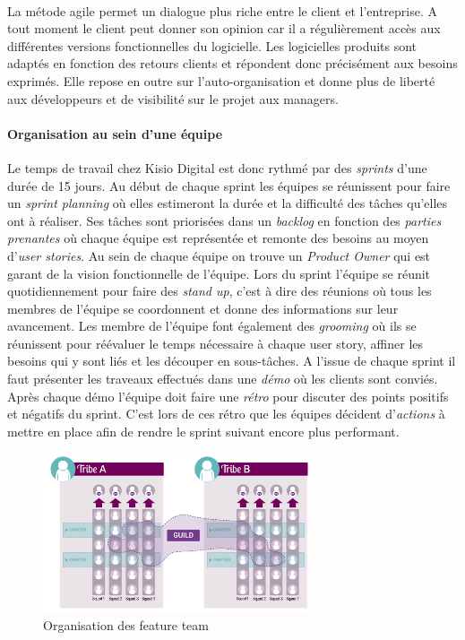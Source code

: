 \documentclass[a4paper]{report}
\begin{document}
\paragraph{} La métode agile permet un dialogue plus riche entre le client et l'entreprise. A tout moment le client peut donner son opinion car il a régulièrement accès aux différentes versions fonctionnelles du logicielle. Les logicielles produits sont adaptés en fonction des retours clients et répondent donc précisément aux besoins exprimés. Elle repose en outre sur l'auto-organisation et donne plus de liberté aux développeurs et de visibilité sur le projet aux managers.


\paragraph {Organisation au sein d'une équipe} Le temps de travail chez Kisio Digital est donc rythmé par des \emph{sprints} d'une durée de 15 jours. Au début de chaque sprint les équipes se réunissent pour faire un \emph{sprint planning} où elles estimeront la durée et la difficulté des tâches qu'elles ont à réaliser. Ses tâches sont priorisées dans un \emph{backlog} en fonction des \emph{parties prenantes} où chaque équipe est représentée et remonte des besoins au moyen d'\emph{user stories}. Au sein de chaque équipe on trouve un \emph{Product Owner} qui est garant de la vision fonctionnelle de l'équipe. Lors du sprint l'équipe se réunit quotidiennement pour faire des \emph{stand up}, c'est à dire des réunions où tous les membres de l'équipe se coordonnent et donne des informations sur leur avancement. Les membre de l'équipe font également des \emph{grooming} où ils se réunissent pour réévaluer le temps nécessaire à chaque user story, affiner les besoins qui y sont liés et les découper en sous-tâches. A l'issue de chaque sprint il faut présenter les traveaux effectués dans une \emph{démo} où les clients sont conviés. Après chaque démo l'équipe doit faire une \emph{rétro} pour discuter des points positifs et négatifs du sprint. C'est lors de ces rétro que les équipes décident d'\emph{actions} à mettre en place afin de rendre le sprint suivant encore plus performant.

\begin{figure}
		\includegraphics[width=8cm]{image/feature_team}
		\caption{Organisation des feature team}
		\label{Organisation des feature team}
\end{figure}
\end{document}
